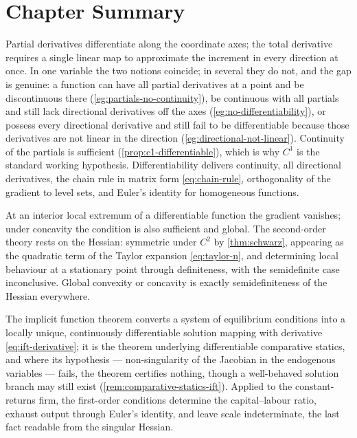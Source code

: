 \section{Chapter Summary}\label{sec:cn-summary}

Partial derivatives differentiate along the coordinate axes; the total derivative
requires a single linear map to approximate the increment in every direction at
once. In one variable the two notions coincide; in several they do not, and the
gap is genuine: a function can have all partial derivatives at a point and be
discontinuous there (\autoref{eg:partials-no-continuity}), be continuous with all
partials and still lack directional derivatives off the axes
(\autoref{eg:no-differentiability}), or possess every directional derivative and
still fail to be differentiable because those derivatives are not linear in the
direction (\autoref{eg:directional-not-linear}). Continuity of the partials is
sufficient
(\autoref{prop:c1-differentiable}), which is why $C^1$ is the standard working
hypothesis. Differentiability delivers continuity, all directional derivatives,
the chain rule in matrix form \eqref{eq:chain-rule}, orthogonality of the
gradient to level sets, and Euler's identity for homogeneous functions.

At an interior local extremum of a differentiable function the gradient vanishes;
under concavity the condition is also sufficient and global. The second-order
theory rests on the Hessian: symmetric under $C^2$ by
\autoref{thm:schwarz}, appearing as the quadratic term of the Taylor expansion
\eqref{eq:taylor-n}, and determining local behaviour at a stationary point
through definiteness, with the semidefinite case inconclusive. Global convexity
or concavity is exactly semidefiniteness of the Hessian everywhere.

The implicit function theorem converts a system of equilibrium conditions into a
locally unique, continuously differentiable solution mapping with derivative
\eqref{eq:ift-derivative}; it is the theorem underlying differentiable
comparative statics, and where its hypothesis --- non-singularity of the Jacobian
in the endogenous variables --- fails, the theorem certifies nothing, though a
well-behaved solution branch may still exist (\autoref{rem:comparative-statics-ift}).
Applied to the constant-returns firm, the first-order conditions determine the
capital--labour ratio, exhaust output through Euler's identity, and leave scale
indeterminate, the last fact readable from the singular Hessian.

